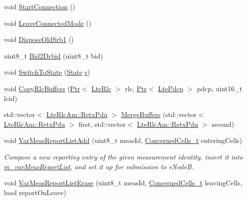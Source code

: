 \begin{DoxyCompactItemize}
\item 
void \hyperlink{classns3_1_1LteUeRrc_ac4257b9ffbca42aba710a3f66a719785}{Start\+Connection} ()
\item 
void \hyperlink{classns3_1_1LteUeRrc_a9fc82457de4787faa95a0ee6e108457d}{Leave\+Connected\+Mode} ()
\item 
void \hyperlink{classns3_1_1LteUeRrc_ad19a088ff16c8c403c9f93cdcd72e639}{Dispose\+Old\+Srb1} ()
\item 
uint8\+\_\+t \hyperlink{classns3_1_1LteUeRrc_af7f9320de34eade4fe17f11bab91082c}{Bid2\+Drbid} (uint8\+\_\+t bid)
\item 
void \hyperlink{classns3_1_1LteUeRrc_a15f1bea4c3c8d3f9949b234c0cfa12e6}{Switch\+To\+State} (\hyperlink{classns3_1_1LteUeRrc_a241012c291e75681150c9214e11f6145}{State} \hyperlink{generate__test__data__lte__sinr_8m_ad83eeb3a142285d1243a08c6b7026df8}{s})
\item 
void \hyperlink{classns3_1_1LteUeRrc_a16b7f4ca06cba845c7af6bb37670242e}{Copy\+Rlc\+Buffers} (\hyperlink{classns3_1_1Ptr}{Ptr}$<$ \hyperlink{classns3_1_1LteRlc}{Lte\+Rlc} $>$ rlc, \hyperlink{classns3_1_1Ptr}{Ptr}$<$ \hyperlink{classns3_1_1LtePdcp}{Lte\+Pdcp} $>$ pdcp, uint16\+\_\+t lcid)
\item 
std\+::vector$<$ \hyperlink{structns3_1_1LteRlcAm_1_1RetxPdu}{Lte\+Rlc\+Am\+::\+Retx\+Pdu} $>$ \hyperlink{classns3_1_1LteUeRrc_a512adbb14d23e5a412830174ef65bf00}{Merge\+Buffers} (std\+::vector$<$ \hyperlink{structns3_1_1LteRlcAm_1_1RetxPdu}{Lte\+Rlc\+Am\+::\+Retx\+Pdu} $>$ first, std\+::vector$<$ \hyperlink{structns3_1_1LteRlcAm_1_1RetxPdu}{Lte\+Rlc\+Am\+::\+Retx\+Pdu} $>$ second)
\item 
void \hyperlink{classns3_1_1LteUeRrc_ab92644dec3b28bb546bf95f616f674b1}{Var\+Meas\+Report\+List\+Add} (uint8\+\_\+t meas\+Id, \hyperlink{classns3_1_1LteUeRrc_abe2ee6e993c02a8e5e924bc777e3fa5c}{Concerned\+Cells\+\_\+t} entering\+Cells)
\begin{DoxyCompactList}\small\item\em Compose a new reporting entry of the given measurement identity, insert it into \hyperlink{classns3_1_1LteUeRrc_a82da3c138c967761910c02b83724a0e4}{m\+\_\+var\+Meas\+Report\+List}, and set it up for submission to e\+NodeB. \end{DoxyCompactList}\item 
void \hyperlink{classns3_1_1LteUeRrc_a3c540caa38f291f381ad1140809c49a0}{Var\+Meas\+Report\+List\+Erase} (uint8\+\_\+t meas\+Id, \hyperlink{classns3_1_1LteUeRrc_abe2ee6e993c02a8e5e924bc777e3fa5c}{Concerned\+Cells\+\_\+t} leaving\+Cells, bool report\+On\+Leave)

\end{DoxyCompactItemize}
